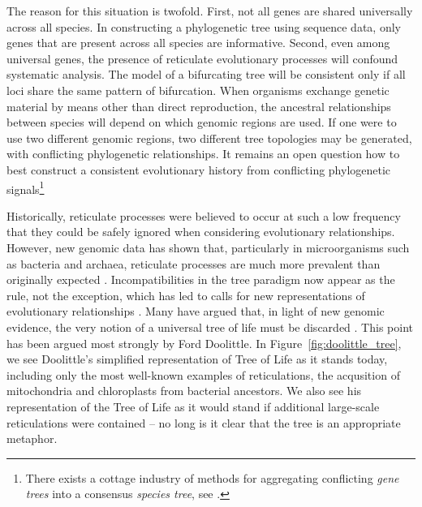 The reason for this situation is twofold.
First, not all genes are shared universally across all species.
In constructing a phylogenetic tree using sequence data, only genes that are present across all species are informative.
Second, even among universal genes, the presence of reticulate evolutionary processes will confound systematic analysis.
The model of a bifurcating tree will be consistent only if all loci share the same pattern of bifurcation.
When organisms exchange genetic material by means other than direct reproduction, the ancestral relationships between species will depend on which genomic regions are used.
If one were to use two different genomic regions, two different tree topologies may be generated, with conflicting phylogenetic relationships.
It remains an open question how to best construct a consistent evolutionary history from conflicting phylogenetic signals\footnote{There exists a cottage industry of methods for aggregating conflicting \emph{gene trees} into a consensus \emph{species tree}, see \cite{Maddison:1997ew}.}

Historically, reticulate processes were believed to occur at such a low frequency that they could be safely ignored when considering evolutionary relationships.
However, new genomic data has shown that, particularly in microorganisms such as bacteria and archaea, reticulate processes are much more prevalent than originally expected \cite{Ochman:2000dr}.
Incompatibilities in the tree paradigm now appear as the rule, not the exception, which has led to calls for new representations of evolutionary relationships \cite{Doolittle:1999,Doolittle:2006}.
Many have argued that, in light of new genomic evidence, the very notion of a universal tree of life must be discarded \cite{Koonin:2008bt,Koonin:2008tj}.
This point has been argued most strongly by Ford Doolittle.
In Figure~\ref{fig:doolittle_tree}, we see Doolittle's simplified representation of Tree of Life as it stands today, including only the most well-known examples of reticulations, the acqusition of mitochondria and chloroplasts from bacterial ancestors.
We also see his representation of the Tree of Life as it would stand if additional large-scale reticulations were contained -- no long is it clear that the tree is an appropriate metaphor.

